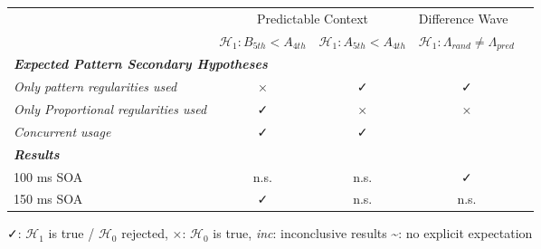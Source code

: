 

\begin{table}
\centering
\begin{tabular*}{\textwidth}{lcllc} 
\toprule
                                                                                                                & \multicolumn{2}{c}{Predictable Context}               & Difference Wave                                                \\ 
\cmidrule(lr){2-3}\cmidrule(lr){4-4}
\multicolumn{1}{c}{}                                                                         & $\mathcal{H_1}: B_{5th}<A_{4th}$     & $\mathcal{H_1}: A_{5th}<A_{4th}$     & \multicolumn{1}{c}{$\mathcal{H_1}: \Lambda_{rand} \neq \Lambda_{pred}$ }  \\ 
\midrule
\multicolumn{5}{l}{\textbf{\textit{Expected Pattern Secondary Hypotheses}}}  \\
\hspace{3mm}\textit{Only pattern regularities used}                                                                                         & \multicolumn{1}{c}{×} & \multicolumn{1}{c}{✓} & \multicolumn{1}{c}{✓}\\
\hspace{3mm}\textit{Only Proportional regularities used}                                                                                    & \multicolumn{1}{c}{✓} & \multicolumn{1}{c}{×} & \multicolumn{1}{c}{×}\\
\hspace{3mm}\textit{Concurrent usage}                                								         & \multicolumn{1}{c}{✓} & \multicolumn{1}{c}{✓} & \multicolumn{1}{c}{}\\
\multicolumn{5}{l}{\textbf{\textit{Results}}}  \\
\hspace{3mm}100 ms SOA                                                                                                                      & \multicolumn{1}{c}{n.s.}                 & \multicolumn{1}{c}{n.s.}                    & \multicolumn{1}{c}{✓}                                      \\
\hspace{3mm}150 ms SOA                                                                                                                      & \multicolumn{1}{c}{✓}                      & \multicolumn{1}{c}{n.s.}                    & \multicolumn{1}{c}{n.s.}                                    \\
\bottomrule
\end{tabular*}
 \begin{tablenotes}
      \small
      \item ✓: $\mathcal{H_1}$ is true / $\mathcal{H_0}$ rejected, ×: $\mathcal{H_0}$ is true, \textit{inc}: inconclusive results \~{}: no explicit expectation
    \end{tablenotes}
\end{table}
